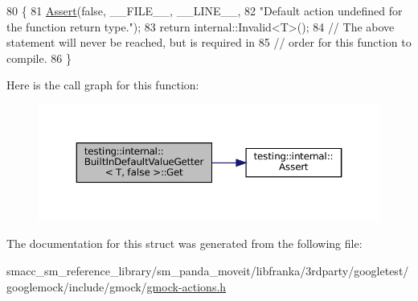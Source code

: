 \begin{DoxyCode}
80                  \{
81     \hyperlink{namespacetesting_1_1internal_a7a259643b7f2d23ce2b757728df42c99}{Assert}(\textcolor{keyword}{false}, \_\_FILE\_\_, \_\_LINE\_\_,
82            \textcolor{stringliteral}{"Default action undefined for the function return type."});
83     \textcolor{keywordflow}{return} internal::Invalid<T>();
84     \textcolor{comment}{// The above statement will never be reached, but is required in}
85     \textcolor{comment}{// order for this function to compile.}
86   \}
\end{DoxyCode}
Here is the call graph for this function\+:
\nopagebreak
\begin{figure}[H]
\begin{center}
\leavevmode
\includegraphics[width=350pt]{structtesting_1_1internal_1_1BuiltInDefaultValueGetter_3_01T_00_01false_01_4_a8c8e929666f61272961eea21a60de4ad_cgraph}
\end{center}
\end{figure}


The documentation for this struct was generated from the following file\+:\begin{DoxyCompactItemize}
\item 
smacc\+\_\+sm\+\_\+reference\+\_\+library/sm\+\_\+panda\+\_\+moveit/libfranka/3rdparty/googletest/googlemock/include/gmock/\hyperlink{gmock-actions_8h}{gmock-\/actions.\+h}\end{DoxyCompactItemize}
